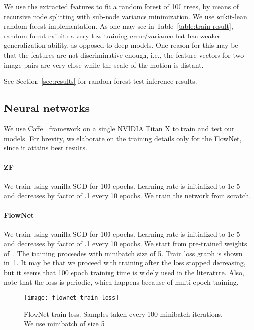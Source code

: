 We use the extracted features to fit a random forest of 100 trees, by
means of recursive node splitting with sub-node variance minimization.
We use scikit-lean~\cite{scikit-learn} random forest implementation.
As one may see in Table~\ref{table:train result}, random forest
exibits a very low training error/variance but has weaker
generalization ability, as opposed to deep models.  One reason for
this may be that the features are not discriminative enough, i.e., the
feature vectors for two image pairs are very close while the scale of
the motion is distant.

See Section~\ref{sec:results} for random forest test inference
results.

\subsection{Neural networks}

We use Caffe~\cite{jia2014caffe} framework on a single NVIDIA Titan X
to train and test our models. For brevity, we elaborate on the
training details only for the FlowNet, since it attains best results.

\paragraph{ZF} We train using vanilla SGD for 100 epochs. Learning
rate is initialized to 1e-5 and decreases by factor of .1 every 10
epochs. We train the network from scratch.


\paragraph{FlowNet} We train using vanilla SGD for 100
epochs. Learning rate is initialized to 1e-5 and decreases by factor
of .1 every 10 epochs. We start from pre-trained weights
of~\cite{fischer2015flownet}. The training proceedes with minibatch
size of 5. Train loss graph is shown in~\ref{fig:flownet_train_loss}.
It may be that we proceed with training after the loss stopped
decreasing, but it seems that 100 epoch training time is widely used
in the literature.  Also, note that the loss is periodic, which
happens because of multi-epoch training.  
\begin{figure}[!ht]
  \centering
  \texttt{[image: flownet\_train\_loss]}
  \caption{FlowNet train loss. Samples taken every 100 minibatch
    iterations.  We use minibatch of size 5}
  \label{fig:flownet_train_loss}
\end{figure}

